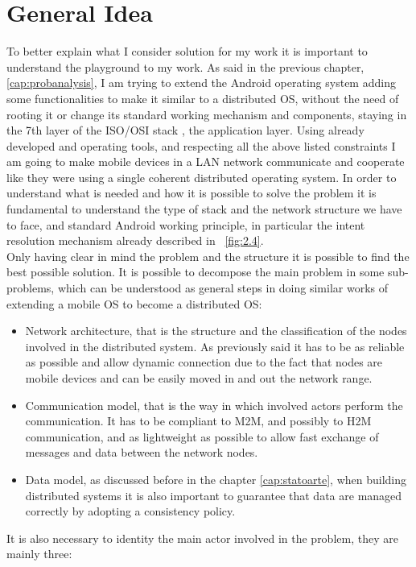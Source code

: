 \section{General Idea}
\par To better explain what I consider solution for my work it is important to
understand the playground to my work. As said in the previous chapter, \ref{cap:probanalysis}, I
am trying to extend the Android operating system adding some functionalities to make it similar to a distributed OS, without the need of rooting it or change its standard working mechanism and components, staying in the 7th layer of the ISO/OSI stack , the application layer. Using already developed and operating tools, and respecting all the above listed constraints I am going to make mobile devices in a LAN network communicate and cooperate like they were using a single coherent distributed operating system.
In order to understand what is needed and how it is possible to solve the problem
it is fundamental to understand the type of stack and the network structure
we have to face, and standard Android working principle, in particular the intent resolution mechanism already described in \figurename~\ref{fig:2.4}.\\
Only having clear in mind the problem and the structure it is possible to find the best possible solution. It is possible to decompose the main problem in some sub-problems, which can be understood as general steps in doing similar works of extending a mobile OS to become a distributed OS:
\begin{itemize}
	\item Network architecture, that is the structure and the classification of the nodes involved in the distributed system. As previously said it has to be as reliable  as possible and allow dynamic connection due to the fact that nodes are mobile devices and can be easily moved in and out the network range.
	\item Communication model, that is the way in which involved actors perform the communication. It has to be compliant to M2M, and possibly to H2M communication, and as lightweight as possible to allow fast exchange of messages and data between the network nodes.
	\item Data model, as discussed before in the chapter \ref{cap:statoarte}, when building distributed systems it is also important to guarantee that data are managed correctly by adopting a consistency policy.
\end{itemize}
It is also necessary to identity the main actor involved in the problem, they are mainly three:
